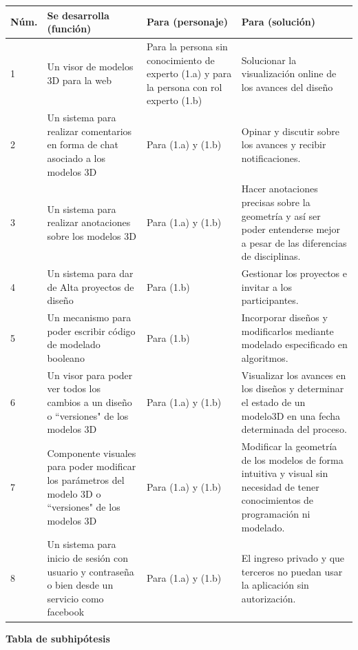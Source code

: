 \begin{longtable}{|p{1cm}|p{4cm}|p{4cm}|p{4cm}| }

\hline
    Núm. & Se desarrolla (función) & Para (personaje)  & Para (solución)\\
\hline
1 & Un visor de modelos 3D para la web & Para la persona sin conocimiento de experto (1.a) y para la persona con rol experto (1.b) & Solucionar la visualización online de los avances del diseño \\
\hline
\hline
2 & Un sistema para realizar comentarios en forma de chat asociado a los modelos 3D & Para (1.a) y (1.b)  & Opinar y discutir sobre los avances y recibir notificaciones.  \\
\hline
\hline
3 & Un sistema para realizar anotaciones sobre los modelos 3D & Para (1.a)  y (1.b) & Hacer anotaciones precisas sobre la geometría y así ser poder entenderse mejor a pesar de las diferencias de disciplinas.  \\
\hline
\hline
4 & Un sistema para dar de Alta proyectos de diseño & Para (1.b) & Gestionar los proyectos e invitar a los participantes.  \\
\hline
\hline
5 & Un mecanismo para poder escribir código de modelado booleano & Para (1.b) & Incorporar diseños y modificarlos mediante modelado especificado en algoritmos. \\
\hline
\hline
6 & Un visor para poder ver todos los cambios a un diseño o ``versiones" de los modelos 3D & Para (1.a) y (1.b) & Visualizar los avances en los diseños y determinar el estado de un modelo3D en una fecha determinada del proceso.  \\
\hline
\hline
7 & Componente visuales para poder modificar los parámetros del modelo 3D o ``versiones" de los modelos 3D & Para (1.a) y (1.b) & Modificar la geometría de los modelos de forma intuitiva y visual sin necesidad de tener conocimientos de programación ni modelado.  \\
\hline
\hline
8 & Un sistema para inicio de sesión con usuario y contraseña o bien desde un servicio como facebook & Para (1.a) y (1.b) & El ingreso privado y que terceros no puedan usar la aplicación sin autorización.  \\
\hline

\end{longtable}

\begin{center}
 \caption{\textbf{ \footnotesize{Tabla de subhipótesis}}}   
\end{center}


